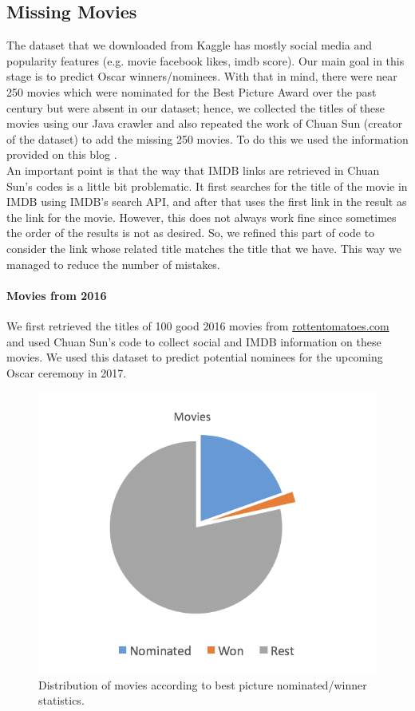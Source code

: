 \documentclass[journal,transmag]{IEEEtran}
\begin{document}
\subsection{Missing Movies}
The dataset that we downloaded from Kaggle has mostly social media and popularity features (e.g. movie facebook likes, imdb score). Our main goal in this stage is to predict Oscar winners/nominees. With that in mind, there were near 250 movies which were nominated for the Best Picture Award over the past century but were absent in our dataset; hence, we collected the titles of these movies using our Java crawler and also repeated the work of Chuan Sun (creator of the dataset) to add the missing 250 movies. To do this we used the information provided on this blog \cite{refCreator}. \\
An important point is that the way that IMDB links are retrieved in Chuan Sun's codes is a little bit problematic. It first searches for the title of the movie in IMDB using IMDB's search API, and after that uses the first link in the result as the link for the movie. However, this does not always work fine since sometimes the order of the results is not as desired. So, we refined this part of code to consider the link whose related title matches the title that we have. This way we managed to reduce the number of mistakes.

\paragraph*{Movies from 2016} We first retrieved the titles of 100 good 2016 movies from  \url{rottentomatoes.com} and used Chuan Sun's code to collect social and IMDB information on these movies. We used this dataset to predict potential nominees for the upcoming Oscar ceremony in 2017. 

\begin{figure}

\includegraphics[scale=.45]{fig1.png}
 \caption{Distribution of movies according to best picture nominated/winner statistics.}
\label{fig4}
\end{figure}
\end{document}
